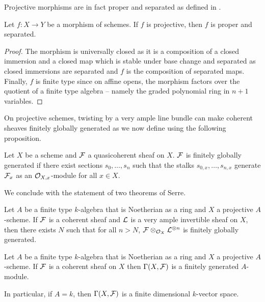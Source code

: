Projective morphisms are in fact proper and separated as defined in . 
\begin{proposition}\label{prop: projective implies proper and separated}
    Let $f:X\to Y$ be a morphism of schemes. If $f$ is projective, then $f$ is proper and separated. 
\end{proposition}
\begin{proof}
    The morphism is universally closed as it is a composition of a closed immersion and a closed map which is stable under base change and separated as closed immersions are separated and $f$ is the composition of separated maps. Finally, $f$ is finite type since on affine opens, the morphism factors over the quotient of a finite type algebra -- namely the graded polynomial ring in $n+1$ variables. 
\end{proof}
On projective schemes, twisting by a very ample line bundle can make coherent sheaves finitely globally generated as we now define using the following proposition. 
\begin{definition}\label{def: finitely globally generated}
    Let $X$ be a scheme and $\mathcal{F}$ a quasicoherent sheaf on $X$. $\mathcal{F}$ is finitely globally generated if there exist sections $s_{0},\dots,s_{n}$ such that the stalks $s_{0,x},\dots,s_{n,x}$ generate $\mathcal{F}_{x}$ as an $\mathcal{O}_{X,x}$-module for all $x\in X$. 
\end{definition}
We conclude with the statement of two theorems of Serre. 
\begin{theorem}\label{def: Serre global generation}
    Let $A$ be a finite type $k$-algebra that is Noetherian as a ring and $X$ a projective $A$-scheme. If $\mathcal{F}$ is a coherent sheaf and $\mathcal{L}$ is a very ample invertible sheaf on $X$, then there exists $N$ such that for all $n>N$, $\mathcal{F}\otimes_{\mathcal{O}_{X}}\mathcal{L}^{\otimes n}$ is finitely globally generated. 
\end{theorem}
\begin{theorem}\label{thm: Serre cohomology}
    Let $A$ be a finite type $k$-algebra that is Noetherian as a ring and $X$ a projective $A$-scheme. If $\mathcal{F}$ is a coherent sheaf on $X$ then $\Gamma(X,\mathcal{F})$ is a finitely generated $A$-module. 
\end{theorem}
In particular, if $A=k$, then $\Gamma(X,\mathcal{F})$ is a finite dimensional $k$-vector space. 